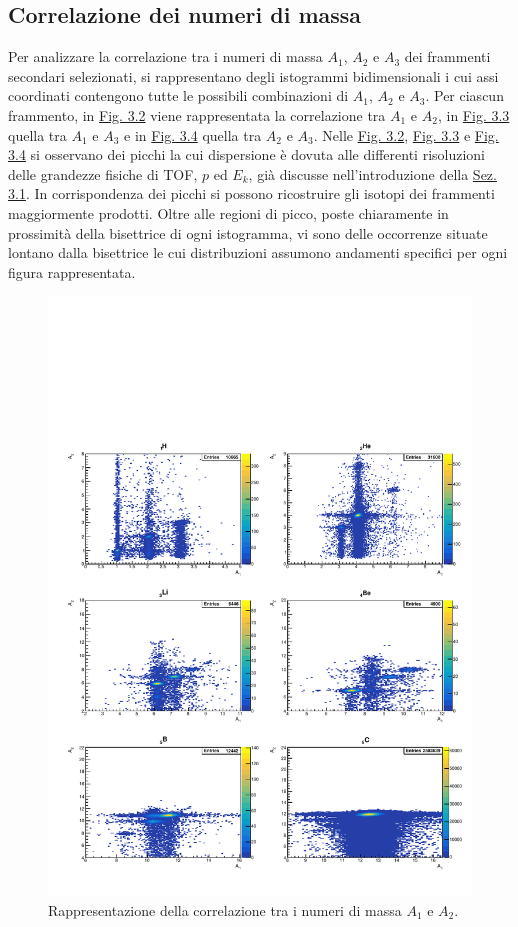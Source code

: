 \documentclass[12pt,a4paper,twoside]{report}
\begin{document}
	\subsection{Correlazione dei numeri di massa}\label{sec:correlation_number_mass}
	Per analizzare la correlazione tra i numeri di massa $A_1$, $A_2$ e $A_3$ dei frammenti secondari selezionati, si rappresentano degli istogrammi bidimensionali i cui assi coordinati contengono tutte le possibili combinazioni di $A_1$, $A_2$ e $A_3$. Per ciascun frammento, in \hyperref[fig:a1]{Fig. 3.2} viene rappresentata la correlazione tra $A_1$ e $A_2$, in \hyperref[fig:a2]{Fig. 3.3} quella tra $A_1$ e $A_3$ e in \hyperref[fig:a3]{Fig. 3.4} quella tra $A_2$ e $A_3$. Nelle \hyperref[fig:a1]{Fig. 3.2}, \hyperref[fig:a2]{Fig. 3.3} e \hyperref[fig:a3]{Fig. 3.4} si osservano dei picchi la cui dispersione è dovuta alle differenti risoluzioni delle grandezze fisiche di TOF, $p$ ed $E_k$, già discusse nell'introduzione della \hyperref[sec:fragment_identification]{Sez. 3.1}. In corrispondenza dei picchi si possono ricostruire gli isotopi dei frammenti maggiormente prodotti. Oltre alle regioni di picco, poste chiaramente in prossimità della bisettrice di ogni istogramma, vi sono delle occorrenze situate lontano dalla bisettrice le cui distribuzioni assumono andamenti specifici per ogni figura rappresentata.
	\begin{figure}[H]
		\centering
		\includegraphics[width=1.03\linewidth,center]{c_MultiCanvas1.pdf}
		\caption{Rappresentazione della correlazione tra i numeri di massa $A_1$ e $A_2$.}
		\label{fig:a1}
	\end{figure}
\end{document}

